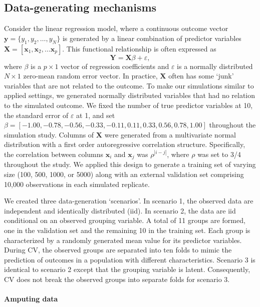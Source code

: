 \documentclass[AMA,STIX1COL,doublespace]{WileyNJD-v2}
\begin{document}
\subsection{Data-generating mechanisms} \label{subsec:data_gen}

Consider the linear regression model, where a continuous outcome vector
\(\textbf{y} = \lbrace y_1, y_2, \ldots, y_N\rbrace\) is generated by a
linear combination of predictor variables
\(\textbf{X} = \left[ \textbf{x}_1, \textbf{x}_2, \ldots \textbf{x}_p \right]\).
This functional relationship is often expressed as
\[\textbf{Y} = \textbf{X} \beta + \varepsilon,\] where \(\beta\) is a
\(p \times 1\) vector of regression coefficients and \(\varepsilon\) is
a normally distributed \(N \times 1\) zero-mean random error vector. In
practice, \(\textbf{X}\) often has some `junk' variables that are not
related to the outcome. To make our simulations similar to applied
settings, we generated normally distributed variables that had no
relation to the simulated outcome. We fixed the number of true predictor
variables at 10, the standard error of \(\varepsilon\) at 1, and set
\(\beta = [-1.00, -0.78, -0.56, -0.33, -0.11, 0.11, 0.33, 0.56, 0.78, 1.00]\)
throughout the simulation study. Columns of \(\textbf{X}\) were
generated from a multivariate normal distribution with a first order
autoregressive correlation structure. Specifically, the correlation
between columns \(\textbf{x}_i\) and \(\textbf{x}_j\) was
\(\rho^{\left| i-j \right|}\), where \(\rho\) was set to 3/4 throughout
the study. We applied this design to generate a training set of varying
size (100, 500, 1000, or 5000) along with an external validation set
comprising 10,000 observations in each simulated replicate.

We created three data-generation `scenarios'. In scenario 1, the
observed data are independent and identically distributed (iid). In
scenario 2, the data are iid conditional on an observed grouping
variable. A total of 11 groups are formed, one in the validation set and
the remaining 10 in the training set. Each group is characterized by a
randomly generated mean value for its predictor variables. During CV,
the observed groups are separated into ten folds to mimic the prediction
of outcomes in a population with different characteristics. Scenario 3
is identical to scenario 2 except that the grouping variable is latent.
Consequently, CV does not break the observed groups into separate folds
for scenario 3.

\paragraph{Amputing data}
\end{document}
